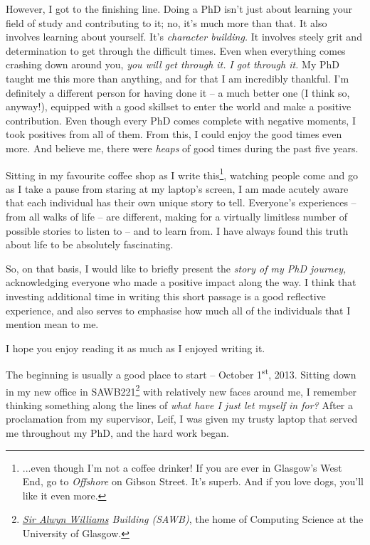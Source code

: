 \begin{preamble}
However, I got to the finishing line. Doing a PhD isn't just about learning your field of study and contributing to it; no, it's much more than that. It also involves learning about yourself. It's \emph{character building.} It involves steely grit and determination to get through the difficult times. Even when everything comes crashing down around you, \emph{you will get through it.} \emph{I got through it.} My PhD taught me this more than anything, and for that I am incredibly thankful. I'm definitely a different person for having done it -- a much better one (I think so, anyway!), equipped with a good skillset to enter the world and make a positive contribution. Even though every PhD comes complete with negative moments, I took positives from all of them. From this, I could enjoy the good times even more. And believe me, there were \emph{heaps} of good times during the past five years.

Sitting in my favourite coffee shop as I write this\footnote{...even though I'm not a coffee drinker! If you are ever in Glasgow's West End, go to \emph{Offshore} on Gibson Street. It's superb. And if you love dogs, you'll like it even more.}, watching people come and go as I take a pause from staring at my laptop's screen, I am made acutely aware that each individual has their own unique story to tell. Everyone's experiences -- from all walks of life -- are different, making for a virtually limitless number of possible stories to listen to -- and to learn from. I have always found this truth about life to be absolutely fascinating.

So, on that basis, I would like to briefly present the \emph{story of my PhD journey,} acknowledging everyone who made a positive impact along the way. I think that investing additional time in writing this short passage is a good reflective experience, and also serves to emphasise how much all of the individuals that I mention mean to me.

I hope you enjoy reading it as much as I enjoyed writing it.

\acksep

The beginning is usually a good place to start -- October 1\textsuperscript{st}, 2013. Sitting down in my new office in SAWB221\footnote{\emph{\href{https://en.wikipedia.org/wiki/Alwyn_Williams_(geologist)}{Sir Alwyn Williams} Building (SAWB)}, the home of Computing Science at the University of Glasgow.} with relatively new faces around me, I remember thinking something along the lines of \emph{what have I just let myself in for?} After a proclamation from my supervisor, Leif, I was given my trusty laptop that served me throughout my PhD, and the hard work began.


\end{preamble}
